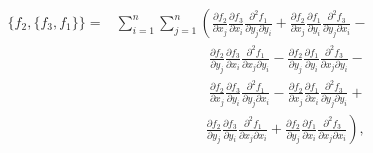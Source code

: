 \begin{align}\begin{split}
    \{f_2, \{f_3, f_1\}\}
    = &\sum_{i=1}^{n} \sum_{j=1}^{n} \left(
        \frac{\partial f_2}{\partial x_j}
        \frac{\partial f_3}{\partial x_i}
        \frac{\partial^2 f_1}{\partial y_j \partial y_i} +
        \frac{\partial f_2}{\partial x_j}
        \frac{\partial f_1}{\partial y_i}
        \frac{\partial^2 f_3}{\partial y_j \partial x_i} - \right.\\
        &\phantom{\sum_{i=1}^{n} \sum_{j=1}^{n}}\ \ \ 
        \frac{\partial f_2}{\partial y_j}
        \frac{\partial f_3}{\partial x_i}
        \frac{\partial^2 f_1}{\partial x_j \partial y_i} - 
        \frac{\partial f_2}{\partial y_j}
        \frac{\partial f_1}{\partial y_i}
        \frac{\partial^2 f_3}{\partial x_j \partial y_i} - \\
        &\phantom{\sum_{i=1}^{n} \sum_{j=1}^{n}}\ \ \ 
        \frac{\partial f_2}{\partial x_j}
        \frac{\partial f_3}{\partial y_i}
        \frac{\partial^2 f_1}{\partial y_j \partial x_i} -
        \frac{\partial f_2}{\partial x_j}
        \frac{\partial f_1}{\partial x_i}
        \frac{\partial^2 f_3}{\partial y_j \partial y_i} + \\
        &\phantom{\sum_{i=1}^{n} \sum_{j=1}^{n}}\ \ \left.
        \frac{\partial f_2}{\partial y_j}
        \frac{\partial f_3}{\partial y_i}
        \frac{\partial^2 f_1}{\partial x_j \partial x_i} +
        \frac{\partial f_2}{\partial y_j}
        \frac{\partial f_1}{\partial x_i}
        \frac{\partial^2 f_3}{\partial x_j \partial x_i}
    \right),
\end{split}\end{align}

